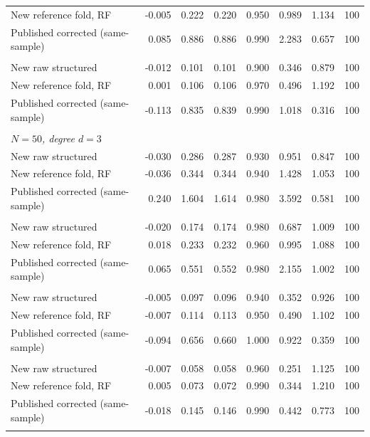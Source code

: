 {\begin{longtable}{lrrrrrrr}
\quad New reference fold, RF & -0.005 & 0.222 & 0.220 & 0.950 & 0.989 & 1.134 & 100 \\
\quad Published corrected (same-sample) & 0.085 & 0.886 & 0.886 & 0.990 & 2.283 & 0.657 & 100 \\
\addlinespace
\multicolumn{8}{l}{\textit{$N=400$, degree $d=2$}} \\
\quad New raw structured & -0.012 & 0.101 & 0.101 & 0.900 & 0.346 & 0.879 & 100 \\
\quad New reference fold, RF & 0.001 & 0.106 & 0.106 & 0.970 & 0.496 & 1.192 & 100 \\
\quad Published corrected (same-sample) & -0.113 & 0.835 & 0.839 & 0.990 & 1.018 & 0.316 & 100 \\
\addlinespace
\multicolumn{8}{l}{\textit{serial\_sweep\_d3}} \\
\multicolumn{8}{l}{\textit{$N=50$, degree $d=3$}} \\
\quad New raw structured & -0.030 & 0.286 & 0.287 & 0.930 & 0.951 & 0.847 & 100 \\
\quad New reference fold, RF & -0.036 & 0.344 & 0.344 & 0.940 & 1.428 & 1.053 & 100 \\
\quad Published corrected (same-sample) & 0.240 & 1.604 & 1.614 & 0.980 & 3.592 & 0.581 & 100 \\
\addlinespace
\multicolumn{8}{l}{\textit{$N=100$, degree $d=3$}} \\
\quad New raw structured & -0.020 & 0.174 & 0.174 & 0.980 & 0.687 & 1.009 & 100 \\
\quad New reference fold, RF & 0.018 & 0.233 & 0.232 & 0.960 & 0.995 & 1.088 & 100 \\
\quad Published corrected (same-sample) & 0.065 & 0.551 & 0.552 & 0.980 & 2.155 & 1.002 & 100 \\
\addlinespace
\multicolumn{8}{l}{\textit{$N=400$, degree $d=3$}} \\
\quad New raw structured & -0.005 & 0.097 & 0.096 & 0.940 & 0.352 & 0.926 & 100 \\
\quad New reference fold, RF & -0.007 & 0.114 & 0.113 & 0.950 & 0.490 & 1.102 & 100 \\
\quad Published corrected (same-sample) & -0.094 & 0.656 & 0.660 & 1.000 & 0.922 & 0.359 & 100 \\
\addlinespace
\multicolumn{8}{l}{\textit{$N=800$, degree $d=3$}} \\
\quad New raw structured & -0.007 & 0.058 & 0.058 & 0.960 & 0.251 & 1.125 & 100 \\
\quad New reference fold, RF & 0.005 & 0.073 & 0.072 & 0.990 & 0.344 & 1.210 & 100 \\
\quad Published corrected (same-sample) & -0.018 & 0.145 & 0.146 & 0.990 & 0.442 & 0.773 & 100 \\
\addlinespace
\end{longtable}
}
